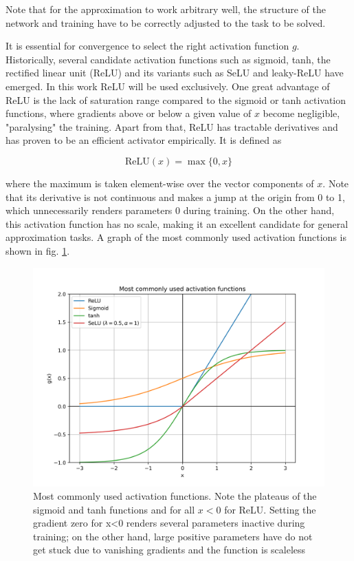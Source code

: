 Note that for the approximation to work arbitrary well, the structure of the network and training have to be correctly adjusted to the task to be solved.

It is essential for convergence to select the right activation function $g$. Historically, several candidate activation functions such as sigmoid, tanh, the rectified linear unit (ReLU) and its variants such as SeLU and leaky-ReLU have emerged. In this work ReLU will be used exclusively. One great advantage of ReLU is the lack of saturation range compared to the sigmoid or tanh activation functions, where gradients above or below a given value of $x$ become negligible, "paralysing" the training. Apart from that, ReLU has tractable derivatives and has proven to be an efficient activator empirically. It is defined as

\begin{equation*}
	\text{ReLU}(x) = \max \{0, x\}
\end{equation*}

where the maximum is taken element-wise over the vector components of $x$. Note that its derivative is not continuous and makes a jump at the origin from 0 to 1, which unnecessarily renders parameters 0 during training. On the other hand, this activation function has no scale, making it an excellent candidate for general approximation tasks. A graph of the most commonly used activation functions is shown in fig. \ref{fig:activations}.

\begin{figure}
	\centering
	\includegraphics[width=0.7\linewidth]{figures/neural_networks/activations}
	\caption{Most commonly used activation functions. Note the plateaus of the sigmoid and tanh functions and for all $x<0$ for ReLU. Setting the gradient zero for x<0 renders several parameters inactive during training; on the other hand, large positive parameters have do not get stuck due to vanishing gradients and the function is scaleless}
	\label{fig:activations}
\end{figure}




